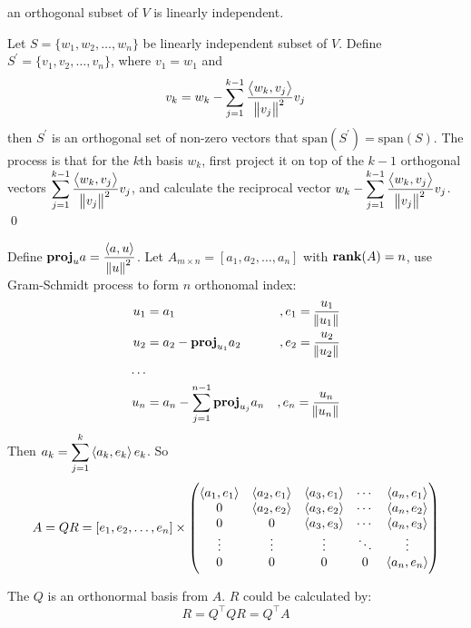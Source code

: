 \begin{theorem}
	an orthogonal subset of $V$ is linearly independent.
\end{theorem}

\begin{definition}
	Let $S=\{w_1, w_2, \dots, w_n \}$ be linearly independent subset of $V$. Define $S^\prime=\{v_1,v_2,\dots,v_n  \}$, where $v_1=w_1$ and 
	\begin{equation}
		v_k = w_k - \sum_{j=1}^{k-1} \frac{\innerproduct{w_k}{v_j}}{\norm{v_j}^2} v_j
	\end{equation}
	then $S^\prime$ is an orthogonal set of non-zero vectors that $\text{span}(S^\prime) = \text{span}(S)$. The process is that for the $k$th basis $w_k$, first project it on top of the $k-1$ orthogonal vectors $\displaystyle \sum_{j=1}^{k-1} \frac{\innerproduct{w_k}{v_j}}{\norm{v_j}^2} v_j$, and calculate the reciprocal vector $\displaystyle w_k - \sum_{j=1}^{k-1} \frac{\innerproduct{w_k}{v_j}}{\norm{v_j}^2} v_j$.
	\qed
\end{definition}

\begin{theorem}
    Define $\displaystyle \projection{a}{u} = \frac{\innerproduct{a}{u}}{\norm{u}^2}$. Let $A_{m \times n} = [a_1, a_2, \dots, a_n]$ with $\rank{A} = n$, use Gram-Schmidt process to form $n$ orthonomal index:
    \begin{equation*}
        \begin{aligned}
            u_1 &= a_1 & , e_1 = \frac{u_1}{\norm{u_1}} \\
            u_2 &= a_2 - \projection{a_2}{u_1} & , e_2 = \frac{u_2}{\norm{u_2}} \\
            \dots \\
            u_n &= a_n - \sum_{j=1}^{n-1} \projection{a_n}{u_j} & , e_n = \frac{u_n}{\norm{u_n}} 
        \end{aligned}
    \end{equation*}
    Then $\displaystyle a_k = \sum_{j=1}^k \innerproduct{a_k}{e_k} e_k$. So
    \begin{equation}
        A = QR = [e_1, e_2, \dots, e_n] \times \begin{pmatrix}
            \innerproduct{a_1}{e_1} & \innerproduct{a_2}{e_1} & \innerproduct{a_3}{e_1} & \cdots & \innerproduct{a_n}{e_1}\\
            0 & \innerproduct{a_2}{e_2} & \innerproduct{a_3}{e_2} & \cdots & \innerproduct{a_n}{e_2}\\
            0 & 0 & \innerproduct{a_3}{e_3} & \cdots & \innerproduct{a_n}{e_3} \\            
            \vdots & \vdots & \vdots & \ddots & \vdots \\
            0 & 0 & 0 & 0 & \innerproduct{a_n}{e_n}
        \end{pmatrix}
    \end{equation}
    
    The $Q$ is an orthonormal basis from $A$. $R$ could be calculated by:
    \begin{equation}
        R = Q^\top Q R = Q^\top A
    \end{equation}
\end{theorem}


